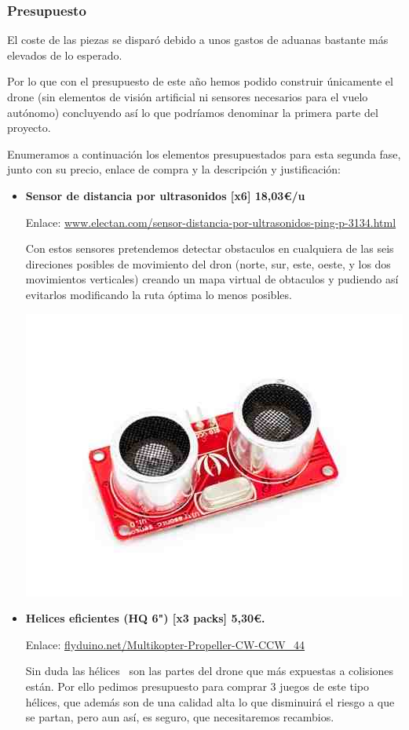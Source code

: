 \documentclass[12pt,twoside]{report}
\begin{document}
\subsubsection{Presupuesto}
El coste de las piezas se disparó debido a unos gastos de aduanas bastante más elevados de lo esperado.

Por lo que con el presupuesto de este año hemos podido construir únicamente el drone (sin elementos de visión artificial ni sensores necesarios para el vuelo autónomo) concluyendo así lo que podríamos denominar la primera parte del proyecto.

Enumeramos a continuación los elementos presupuestados para esta segunda fase, junto con su precio, enlace de compra y la descripción y justificación:

\begin{itemize}
\item  {\bf Sensor de distancia por ultrasonidos [x6] 18,03\euro{}/u}

Enlace: \url{www.electan.com/sensor-distancia-por-ultrasonidos-ping-p-3134.html}

Con estos sensores pretendemos detectar obstaculos en cualquiera de las seis direciones posibles de movimiento del dron (norte, sur, este, oeste, y los dos movimientos verticales) creando un mapa virtual de obtaculos y pudiendo así evitarlos modificando la ruta óptima lo menos posibles.

\centerline{
    \includegraphics[width=0.45\linewidth]{fotos/sensor_ultra.jpg}}

\item {\bf Helices eficientes (HQ 6") [x3 packs] 5,30\euro{}.}

Enlace: \url{flyduino.net/Multikopter-Propeller-CW-CCW_44}

Sin duda las hélices  son las partes del drone que más expuestas a colisiones están. Por ello pedimos presupuesto para comprar 3 juegos de este tipo hélices, que además son de una calidad alta lo que disminuirá el riesgo a que se partan, pero aun así, es seguro, que necesitaremos recambios.


\end{itemize}
\end{document}
